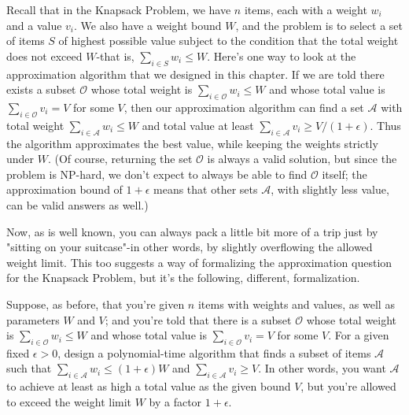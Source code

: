   \begin{problem}
    Recall that in the Knapsack Problem, we have $n$ items, each with a weight $w_i$ and a value $v_i$. We also have a weight bound $W$, and the problem is to select a set of items $S$ of highest possible value subject to the condition that the total weight does not exceed $W$-that is, $\sum_{i\in{S}}w_i\leq W$. Here's one way to look at the approximation algorithm that we designed in this chapter. If we are told there exists a subset $\mathcal{O}$ whose total weight is $\sum_{i\in{\mathcal{O}}}w_i\leq W$ and whose total value is $\sum_{i\in{\mathcal{O}}}v_i= V$ for some $V$, then our approximation algorithm can find a set $\mathcal{A}$ with total weight $\sum_{i\in{\mathcal{A}}}w_i\leq W$ and total value at least $\sum_{i\in{\mathcal{A}}}v_i\geq V/(1+\epsilon)$. Thus the algorithm approximates the best value, while keeping the weights strictly under $W$. (Of course, returning the set $\mathcal{O}$ is always a valid solution, but since the problem is NP-hard, we don't expect to always be able to find $\mathcal{O}$ itself; the approximation bound of $1+\epsilon$ means that other sets $\mathcal{A}$, with slightly less value, can be valid answers as well.)
    
    Now, as is well known, you can always pack a little bit more of a trip just by "sitting on your suitcase"-in other words, by slightly overflowing the allowed weight limit. This too suggests a way of formalizing the approximation question for the Knapsack Problem, but it's the following, different, formalization.
    
    Suppose, as before, that you're given $n$ items with weights and values, as well as parameters $W$ and $V$; and you're told that there is a subset $\mathcal{O}$ whose total weight is $\sum_{i\in\mathcal{O}}w_i\leq W$ and whose total value is $\sum_{i\in\mathcal{O}}v_i=V$ for some $V$. For a given fixed $\epsilon>0$, design a polynomial-time algorithm that finds a subset of items $\mathcal{A}$ such that $\sum_{i\in\mathcal{A}}w_i\leq(1+\epsilon)W$ and $\sum_{i\in\mathcal{A}}v_i\geq V$. In other words, you want $\mathcal{A}$ to achieve at least as high a total value as the given bound $V$, but you're allowed to exceed the weight limit $W$ by a factor $1+\epsilon$.
    

\end{problem}
